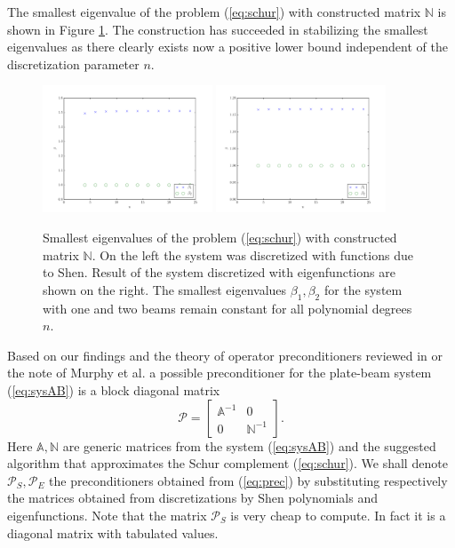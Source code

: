 \documentclass{marine_2015}
\begin{document}
The smallest eigenvalue of the problem (\ref{eq:schur}) with constructed matrix 
$\mathbb{N}$ is shown in Figure \ref{fig:schur}. The construction has
succeeded in stabilizing the smallest eigenvalues as there clearly exists now a 
positive lower bound independent of the discretization parameter $n$.
 \begin{figure}[h!]
   \vspace{-10pt}
 \centering
 \includegraphics[width=0.45\textwidth]{img/Schur_precond_shen_cond}
 \includegraphics[width=0.45\textwidth]{img/Schur_precond_sine_cond}\\
 \caption{Smallest eigenvalues of the problem (\ref{eq:schur}) with constructed
 matrix $\mathbb{N}$. On the left the system was discretized with functions due
 to Shen. Result of the system discretized with eigenfunctions are shown on the
 right. The smallest eigenvalues $\beta_1, \beta_2$ for the system with one and
 two beams remain constant for all polynomial degrees $n$.}
 \label{fig:schur}
 \end{figure}

Based on our findings and the theory of operator preconditioners reviewed in
\cite{kent} or the note of Murphy et al. \cite{golub} a possible preconditioner 
for the plate-beam system (\ref{eq:sysAB}) is a block diagonal matrix
\begin{equation}
\label{eq:prec}
\mathcal{P} = 
    \begin{bmatrix}
      \mathbb{A}^{-1} & 0 \\
      0 & \mathbb{N}^{-1}
    \end{bmatrix}.
\end{equation}
Here $\mathbb{A}, \mathbb{N}$ are generic matrices from the system
(\ref{eq:sysAB}) and the suggested algorithm that approximates the Schur
complement (\ref{eq:schur}). We shall denote $\mathcal{P}_S, \mathcal{P}_E$ the 
preconditioners obtained from (\ref{eq:prec}) by substituting respectively the 
matrices obtained from discretizations by Shen polynomials and eigenfunctions.
Note that the matrix $\mathcal{P}_S$ is very cheap to compute. In fact it 
is a diagonal matrix with tabulated values.
\end{document}
